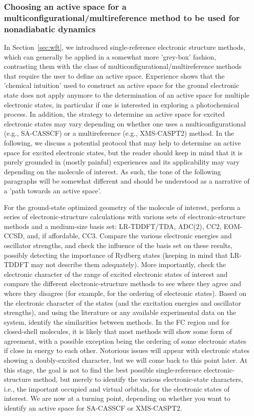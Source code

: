 \documentclass[9pt,bestpractices,pubversion]{livecoms}
\begin{document}
\subsubsection{Choosing an active space for a multiconfigurational/multireference method to be used for nonadiabatic dynamics}
\label{sec:activespace}
In Section~\ref{sec:wft}, we introduced single-reference electronic structure methods, which can generally be applied in a somewhat more 'grey-box' fashion, contrasting them with the class of multiconfigurational/multireference methods that require the user to define an active space.
Experience shows that the 'chemical intuition' used to construct an active space for the ground electronic state does not apply anymore to the determination of an active space for multiple electronic states, in particular if one is interested in exploring a photochemical process. In addition, the strategy to determine an active space for excited electronic states may vary depending on whether one uses a multiconfigurational (e.g., SA-CASSCF) or a multireference (e.g., XMS-CASPT2) method. In the following, we discuss a potential protocol that may help to determine an active space for excited electronic states, but the reader should keep in mind that it is purely grounded in (mostly painful) experiences and its applicability may vary depending on the molecule of interest. As such, the tone of the following paragraphs will be somewhat different and should be understood as a narrative of a 'path towards an active space'.

For the ground-state optimized geometry of the molecule of interest, perform a series of electronic-structure calculations with various sets of electronic-structure methods and a medium-size basis set: LR-TDDFT/TDA, ADC(2), CC2, EOM-CCSD, and, if affordable, CC3. Compare the various electronic energies and oscillator strengths, and check the influence of the basis set on these results, possibly detecting the importance of Rydberg states (keeping in mind that LR-TDDFT may not describe them adequately). More importantly, check the electronic character of the range of excited electronic states of interest and compare the different electronic-structure methods to see where they agree and where they disagree (for example, for the ordering of electronic states). Based on the electronic character of the states (and the excitation energies and oscillator strengths), and using the literature or any available experimental data on the system, identify the similarities between methods. In the FC region and for closed-shell molecules, it is likely that most methods will show some form of agreement, with a possible exception being the ordering of some electronic states if close in energy to each other. Notorious issues will appear with electronic states showing a doubly-excited character, but we will come back to this point later. At this stage, the goal is not to find the best possible single-reference electronic-structure method, but merely to identify the various electronic-state characters, i.e., the important occupied and virtual orbitals, for the electronic states of interest. We are now at a turning point, depending on whether you want to identify an active space for SA-CASSCF  or XMS-CASPT2. 
\end{document}
